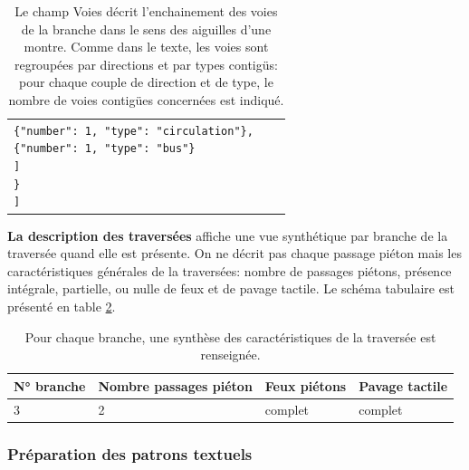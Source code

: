 \begin{table}[ht]
\begin{center}
\begin{tabular}{ | l | l | l |}
{                \hspace{1.5cm}\texttt{\{"number": 1, "type": "circulation"\},}\\
                \hspace{1.5cm}\texttt{\{"number": 1, "type": "bus"\}}\\
                \hspace{1cm}\texttt{]}\\
                \hspace{0.5cm}\texttt{\}}\\
                \texttt]
            }
        \end{tabular}
    \end{center}
    \caption[Schéma tabulaire de la description des branches]{Le champ Voies décrit l'enchainement des voies de la branche dans le sens des aiguilles d'une montre. Comme dans le texte, les voies sont regroupées par directions et par types contigüs: pour chaque couple de direction et de type, le nombre de voies contigües concernées est indiqué.}
    \label{tab:experimentation_desc_branches}
\end{table}

\newpar{}

\textbf{La description des traversées} affiche une vue synthétique par branche de la traversée quand elle est présente. On ne décrit pas chaque passage piéton mais les caractéristiques générales de la traversées: nombre de passages piétons, présence intégrale, partielle, ou nulle de feux et de pavage tactile. Le schéma tabulaire est présenté en table \ref{tab:experimentation_desc_traversées}.

\newpar{}

\begin{table}[ht]
    \begin{center}
        \footnotesize
        \begin{tabular}{ | l | l | l | l | }
            \textbf{N° branche} & \textbf{Nombre passages piéton} & \textbf{Feux piétons} & \textbf{Pavage tactile}\tabularnewline
            \hline
            3 & 2 & complet & complet
        \end{tabular}
    \end{center}
    \caption[Schéma tabulaire de la description des traversées]{Pour chaque branche, une synthèse des caractéristiques de la traversée est renseignée.}
    \label{tab:experimentation_desc_traversées}
\end{table}

\subsubsection{Préparation des patrons textuels}

